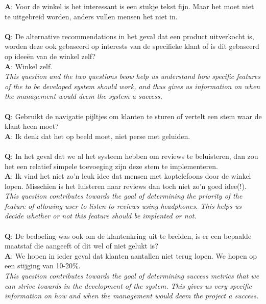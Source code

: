 \documentclass[a4paper]{article}
\begin{document}
\textbf{A}: Voor de winkel is het interessant is een stukje tekst fijn. Maar het moet niet te uitgebreid worden, anders vullen mensen het niet in.\\
\\
\textbf{Q}: De alternative recommendations in het geval dat een product uitverkocht is, worden deze ook gebaseerd op interests van de specifieke klant of is dit gebaseerd op ideeën van de winkel zelf?\\
\textbf{A}: Winkel zelf.\\
\textit{This question and the two questions beow help us understand how specific features of the to be developed system should work, and thus gives us information on when the management would deem the system a success.}\\
\\
\textbf{Q}: Gebruikt de navigatie pijltjes om klanten te sturen of vertelt een stem waar de klant heen moet?\\
\textbf{A}: Ik denk dat het op beeld moet, niet perse met geluiden. \\
\\
\textbf{Q}: In het geval dat we al het systeem hebben om reviews te beluisteren, dan zou het een relatief simpele toevoeging zijn deze stem te implementeren.\\
\textbf{A}: Ik vind het niet zo'n leuk idee dat mensen met koptelefoons door de winkel lopen. Misschien is het luisteren naar reviews dan toch niet zo'n goed idee(!).\\
\textit{This question contributes towards the goal of determining the priority of the feature of allowing user to listen to reviews using headphones. This helps us decide whether or not this feature should be implented or not.}\\
\\
\textbf{Q}: De bedoeling was ook om de klantenkring uit te breiden, is er een bepaalde maatstaf die aangeeft of dit wel of niet gelukt is?\\
\textbf{A}: We hopen in ieder geval dat klanten aantallen niet terug lopen. We hopen op een stijging van 10-20\%.\\
\textit{This question contributes towards the goal of determining success metrics that we can strive towards in the development of the system. This gives us very specific information on how and when the management would deem the project a success.}
\end{document}
